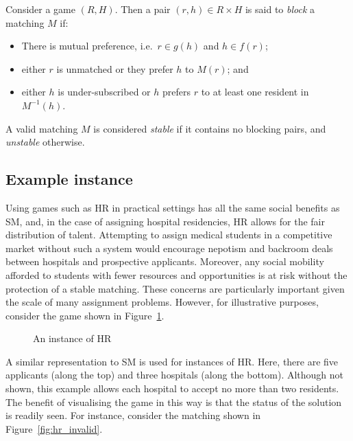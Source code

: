 \begin{definition}\label{def:hr_blocking}
    Consider a game \((R, H)\). Then a pair \((r, h) \in R \times H\) is said to
    \emph{block} a matching \(M\) if:

    \begin{itemize}
        \item There is mutual preference, i.e.\ \(r \in g(h)\) and \(h \in
            f(r)\);
        \item either \(r\) is unmatched or they prefer \(h\) to \(M(r)\); and
        \item either \(h\) is under-subscribed or \(h\) prefers \(r\) to at
            least one resident in \(M^{-1}(h)\).
    \end{itemize}

    A valid matching \(M\) is considered \emph{stable} if it contains no
    blocking pairs, and \emph{unstable} otherwise.
\end{definition}

\subsection{Example instance}

Using games such as HR in practical settings has all the same social benefits as
SM, and, in the case of assigning hospital residencies, HR allows for the fair
distribution of talent. Attempting to assign medical students in a competitive
market without such a system would encourage nepotism and backroom deals between
hospitals and prospective applicants. Moreover, any social mobility afforded to
students with fewer resources and opportunities is at risk without the
protection of a stable matching. These concerns are particularly important given
the scale of many assignment problems. However, for illustrative purposes,
consider the game shown in Figure~\ref{fig:hr_matching}.

\begin{figure}[htbp]
    \centering
    
    \caption{An instance of HR}\label{fig:hr_matching}
\end{figure}

A similar representation to SM is used for instances of HR. Here, there are five
applicants (along the top) and three hospitals (along the bottom). Although not
shown, this example allows each hospital to accept no more than two residents.
The benefit of visualising the game in this way is that the status of the
solution is readily seen. For instance, consider the matching shown in
Figure~\ref{fig:hr_invalid}.

